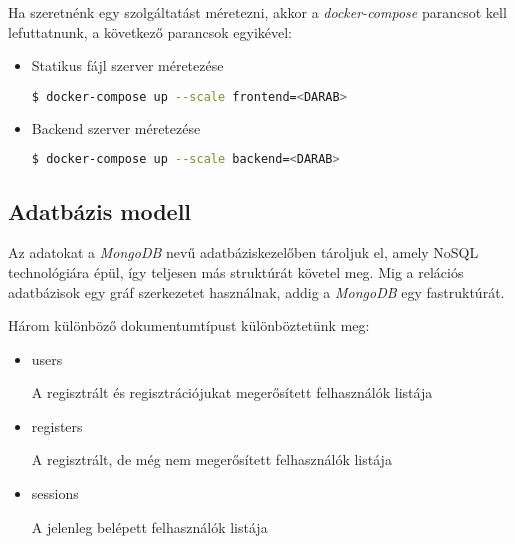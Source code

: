 Ha szeretnénk egy szolgáltatást méretezni, akkor a \emph{docker-compose} parancsot kell lefuttatnunk, a következő parancsok egyikével:

\begin{itemize}
    \item Statikus fájl szerver méretezése
    \begin{lstlisting}[language=bash]
        $ docker-compose up --scale frontend=<DARAB>
    \end{lstlisting}
    \item Backend szerver méretezése
    \begin{lstlisting}[language=bash]
        $ docker-compose up --scale backend=<DARAB>
    \end{lstlisting}
\end{itemize}
    
\subsection{Adatbázis modell}

Az adatokat a \emph{MongoDB} nevű adatbáziskezelőben tároljuk el, amely NoSQL technológiára épül, így teljesen más struktúrát követel meg. Mig a relációs adatbázisok egy gráf szerkezetet használnak, addig a \emph{MongoDB} egy fastruktúrát.

Három különböző dokumentumtípust különböztetünk meg:
\begin{itemize}
    \item users

    A regisztrált és regisztrációjukat megerősített felhasználók listája
    \item registers

    A regisztrált, de még nem megerősített felhasználók listája
    \item sessions

    A jelenleg belépett felhasználók listája
\end{itemize}

